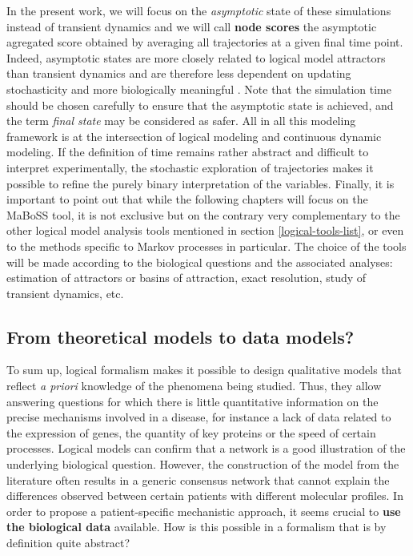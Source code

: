 \documentclass[a4paper,12pt,twoside,onecolumn,openright,final,oldfontcommands]{memoir}
\begin{document}
In the present work, we will focus on the \emph{asymptotic} state of
these simulations instead of transient dynamics and we will call
\textbf{node scores} the asymptotic agregated score obtained by
averaging all trajectories at a given final time point. Indeed,
asymptotic states are more closely related to logical model attractors
than transient dynamics and are therefore less dependent on updating
stochasticity and more biologically meaningful \citep{huang2009cancer}.
Note that the simulation time should be chosen carefully to ensure that
the asymptotic state is achieved, and the term \emph{final state} may be
considered as safer. All in all this modeling framework is at the
intersection of logical modeling and continuous dynamic modeling. If the
definition of time remains rather abstract and difficult to interpret
experimentally, the stochastic exploration of trajectories makes it
possible to refine the purely binary interpretation of the variables.
Finally, it is important to point out that while the following chapters
will focus on the MaBoSS tool, it is not exclusive but on the contrary
very complementary to the other logical model analysis tools mentioned
in section \ref{logical-tools-list}, or even to the methods specific to
Markov processes in particular. The choice of the tools will be made
according to the biological questions and the associated analyses:
estimation of attractors or basins of attraction, exact resolution,
study of transient dynamics, etc.

\subsection{From theoretical models to data
models?}\label{from-theoretical-models-to-data-models}

To sum up, logical formalism makes it possible to design qualitative
models that reflect \emph{a priori} knowledge of the phenomena being
studied. Thus, they allow answering questions for which there is little
quantitative information on the precise mechanisms involved in a
disease, for instance a lack of data related to the expression of genes,
the quantity of key proteins or the speed of certain processes. Logical
models can confirm that a network is a good illustration of the
underlying biological question. However, the construction of the model
from the literature often results in a generic consensus network that
cannot explain the differences observed between certain patients with
different molecular profiles. In order to propose a patient-specific
mechanistic approach, it seems crucial to \textbf{use the biological
data} available. How is this possible in a formalism that is by
definition quite abstract?
\end{document}
